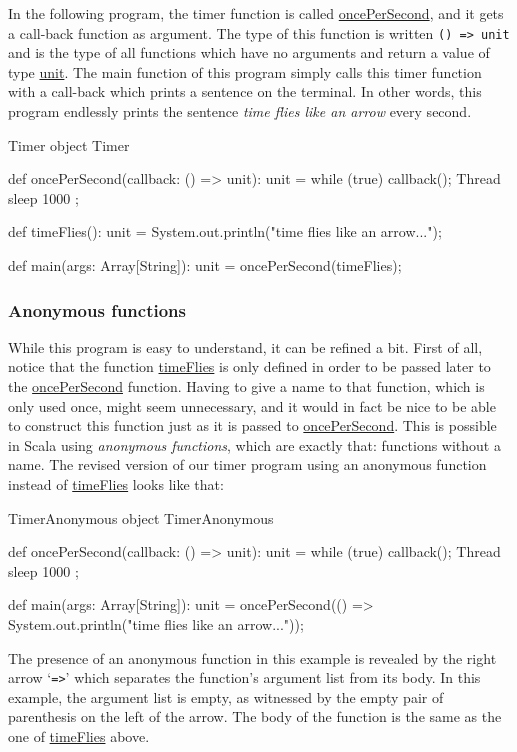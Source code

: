 \documentclass[a4paper,12pt]{article}
\newcommand{\langname}[1]{#1\xspace}
\newcommand{\Scala}{\langname{Scala}}
\newcommand{\ident}[1]{\url{#1}\xspace}
\begin{document}
In the following program, the timer function is called
\ident{oncePerSecond}, and it gets a call-back function as argument.
The type of this function is written \verb|() => unit| and is the type
of all functions which have no arguments and return a value of type
\ident{unit}. The main function of this program simply calls this
timer function with a call-back which prints a sentence on the
terminal. In other words, this program endlessly prints the sentence
\emph{time flies like an arrow} every second.

\begin{scalaprogram}{Timer}
object Timer {
  def oncePerSecond(callback: () => unit): unit =
    while (true) { callback(); Thread sleep 1000 };

  def timeFlies(): unit =
    System.out.println("time flies like an arrow...");

  def main(args: Array[String]): unit =
    oncePerSecond(timeFlies);
}
\end{scalaprogram}

\subsubsection{Anonymous functions}
\label{sec:anonymous-functions}

While this program is easy to understand, it can be refined a bit.
First of all, notice that the function \ident{timeFlies} is only
defined in order to be passed later to the \ident{oncePerSecond}
function. Having to give a name to that function, which is only used
once, might seem unnecessary, and it would in fact be nice to be able
to construct this function just as it is passed to
\ident{oncePerSecond}. This is possible in \Scala using
\emph{anonymous functions}, which are exactly that: functions without
a name. The revised version of our timer program using an anonymous
function instead of \ident{timeFlies} looks like that:
\begin{scalaprogram}{TimerAnonymous}
object TimerAnonymous {
  def oncePerSecond(callback: () => unit): unit =
    while (true) { callback(); Thread sleep 1000 };

  def main(args: Array[String]): unit =
    oncePerSecond(() =>
      System.out.println("time flies like an arrow..."));
}
\end{scalaprogram}
The presence of an anonymous function in this example is revealed by
the right arrow `\verb|=>|' which separates the function's argument
list from its body. In this example, the argument list is empty, as
witnessed by the empty pair of parenthesis on the left of the arrow.
The body of the function is the same as the one of \ident{timeFlies}
above.
\end{document}
